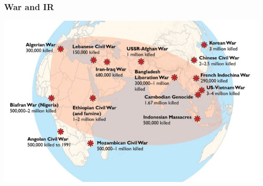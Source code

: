 \documentclass[aspectratio=43]{beamer}
\begin{document}
\begin{frame}
\begin{minipage}{.49\textwidth}
\end{minipage}

\end{frame}

\begin{frame}
\frametitle{War and IR}
\centering

\includegraphics[width = \textwidth]{img/coldwar_conflicts}

\end{frame}
\end{document}
